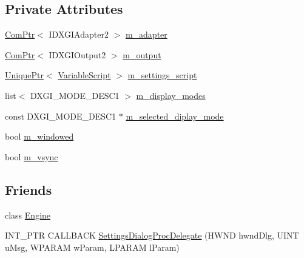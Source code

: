 \subsection*{Private Attributes}
\begin{DoxyCompactItemize}
\item 
\hyperlink{namespacemage_ae74f374780900893caa5555d1031fd79}{Com\+Ptr}$<$ I\+D\+X\+G\+I\+Adapter2 $>$ \hyperlink{classmage_1_1_device_enumeration_af53e43c5c1d67421831993a5fdc6014a}{m\+\_\+adapter}
\item 
\hyperlink{namespacemage_ae74f374780900893caa5555d1031fd79}{Com\+Ptr}$<$ I\+D\+X\+G\+I\+Output2 $>$ \hyperlink{classmage_1_1_device_enumeration_a49580b67748053ed6172d6458b5083ca}{m\+\_\+output}
\item 
\hyperlink{namespacemage_a8c307fbcc33bce9b7f2aa4c26c3b95cf}{Unique\+Ptr}$<$ \hyperlink{classmage_1_1_variable_script}{Variable\+Script} $>$ \hyperlink{classmage_1_1_device_enumeration_ab6a58580daf27bff07ba7df428833616}{m\+\_\+settings\+\_\+script}
\item 
list$<$ D\+X\+G\+I\+\_\+\+M\+O\+D\+E\+\_\+\+D\+E\+S\+C1 $>$ \hyperlink{classmage_1_1_device_enumeration_aae356ac476a35ce4074f61cfd75ecdbe}{m\+\_\+display\+\_\+modes}
\item 
const D\+X\+G\+I\+\_\+\+M\+O\+D\+E\+\_\+\+D\+E\+S\+C1 $\ast$ \hyperlink{classmage_1_1_device_enumeration_a74b32839bda6446db56aaf4b6dd25f20}{m\+\_\+selected\+\_\+diplay\+\_\+mode}
\item 
bool \hyperlink{classmage_1_1_device_enumeration_a277c5dae7861c9cb1175192a61274cc9}{m\+\_\+windowed}
\item 
bool \hyperlink{classmage_1_1_device_enumeration_a027220f50649c40785e2b918411adfad}{m\+\_\+vsync}
\end{DoxyCompactItemize}
\subsection*{Friends}
\begin{DoxyCompactItemize}
\item 
class \hyperlink{classmage_1_1_device_enumeration_a3e1914489e4bed4f9f23cdeab34a43dc}{Engine}
\item 
I\+N\+T\+\_\+\+P\+TR C\+A\+L\+L\+B\+A\+CK \hyperlink{classmage_1_1_device_enumeration_a3dff4eb8907e2e10f26cc616fe1c104d}{Settings\+Dialog\+Proc\+Delegate} (H\+W\+ND hwnd\+Dlg, U\+I\+NT u\+Msg, W\+P\+A\+R\+AM w\+Param, L\+P\+A\+R\+AM l\+Param)
\end{DoxyCompactItemize}


